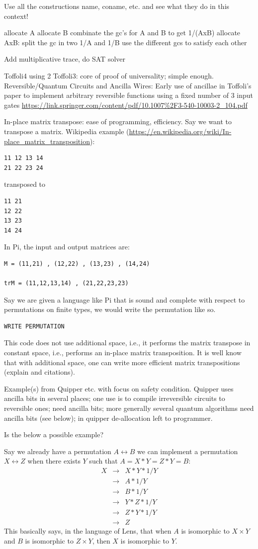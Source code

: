 \documentclass[sigplan,10pt,review,anonymous]{acmart}
\begin{document}
Use all the constructions name, coname, etc. and see what they do in this context!  
 
allocate A
allocate B
combinate the gc's for A and B to get 1/(AxB)
allocate AxB: split the gc in two 1/A and 1/B
use the different gcs to satisfy each other

Add multiplicative trace, do SAT solver

Toffoli4 using 2 Toffoli3: core of proof of universality; simple
enough. Reversible/Quantum Circuits and Ancilla Wires: Early use of
ancillae in Toffoli's paper to implement arbitrary reversible
functions using a fixed number of 3 input gates
\url{https://link.springer.com/content/pdf/10.1007%2F3-540-10003-2_104.pdf}

In-place matrix transpose: ease of programming, efficiency. Say we
want to transpose a matrix. Wikipedia example
(\url{https://en.wikipedia.org/wiki/In-place_matrix_transposition}):
\begin{verbatim}
11 12 13 14 
21 22 23 24 
\end{verbatim}
transposed to
\begin{verbatim}
11 21
12 22
13 23
14 24
\end{verbatim}
In Pi, the input and output matrices are:
\begin{verbatim}
M = (11,21) , (12,22) , (13,23) , (14,24) 

trM = (11,12,13,14) , (21,22,23,23) 
\end{verbatim}
Say we are given a language like Pi that is sound and complete with
respect to permutations on finite types, we would write the
permutation like so.
\begin{verbatim}
WRITE PERMUTATION
\end{verbatim}
This code does not use additional space, i.e., it performs the matrix
transpose in constant space, i.e., performs an in-place matrix
transposition. It is well know that with additional space, one can
write more efficient matrix transpositions (explain and citations).

Example(s) from Quipper etc. with focus on safety condition. Quipper
uses ancilla bits in several places; one use is to compile
irreversible circuits to reversible ones; need ancilla bits; more
generally several quantum algorithms need ancilla bits (see below); in
quipper de-allocation left to programmer.

Is the below a possible example?

Say we already have a permutation $A \leftrightarrow B$
we can implement a permutation $X \leftrightarrow Z$ 
when there exists $Y$ such that $A = X * Y = Z * Y = B$:
\[\begin{array}{rcl}
X &\rightarrow& X * Y * 1/Y \\
  &\rightarrow& A * 1/Y \\
  &\rightarrow&  B * 1/Y \\
  &\rightarrow&  Y * Z * 1/Y \\
  &\rightarrow&  Z * Y * 1/Y \\
  &\rightarrow&  Z
\end{array}\]
This basically says, in the language of Lens, that
when $A$ is isomorphic to $X \times Y$ and
$B$ is isomorphic to $Z \times Y$, then
$X$ is isomorphic to $Y$.
\end{document}
